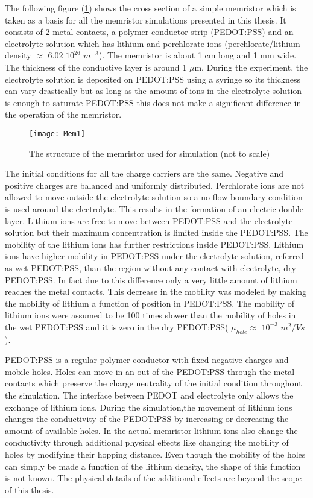 \begin{doublespace}
The following figure (\ref{MemStc}) shows the cross section of a simple memristor which is taken as a basis for all the memristor simulations presented in this thesis. It consists of 2 metal contacts, a polymer conductor strip (PEDOT:PSS) and an electrolyte solution which has lithium and perchlorate ions (perchlorate/lithium density $\approx$ 6.02 $10^{26}$ $m^{-3}$). The memristor is about 1 cm long and 1 mm wide. The thickness of the conductive layer is around 1 $\mu$m. During the experiment, the electrolyte solution is deposited on PEDOT:PSS using a syringe so its thickness can vary drastically but as long as the amount of ions in the electrolyte solution is enough to saturate PEDOT:PSS this does not make a significant difference in the operation of the memristor.

\begin{figure}[!htp]
\centering
\texttt{[image: Mem1]}
\caption{The structure of the memristor used for simulation (not to scale)} 
\label{MemStc}
\end{figure}

The initial conditions for all the charge carriers are the same. Negative and positive charges are balanced and uniformly distributed. Perchlorate ions are not allowed to move outside the electrolyte solution so a no flow boundary condition is used around the electrolyte. This results in the formation of an electric double layer. Lithium ions are free to move between PEDOT:PSS and the electrolyte solution but their maximum concentration is limited inside the PEDOT:PSS. The mobility of the lithium ions has further restrictions inside PEDOT:PSS. Lithium ions have higher mobility in PEDOT:PSS under the electrolyte solution, referred as wet PEDOT:PSS, than the region without any contact with electrolyte, dry PEDOT:PSS. In fact due to this difference only a very little amount of lithium reaches the metal contacts. This decrease in the mobility was modeled by making the mobility of lithium a function of position in PEDOT:PSS. The mobility of lithium ions were assumed to be 100 times slower than the mobility of holes in the wet PEDOT:PSS and it is zero in the dry PEDOT:PSS( $\mu_{hole} \approx$ $10^{-3}$ $m^2/Vs$). 

PEDOT:PSS is a regular polymer conductor with fixed negative charges and mobile holes. Holes can move in an out of the PEDOT:PSS through the metal contacts which preserve the charge neutrality of the initial condition throughout the simulation. The interface between PEDOT and electrolyte only allows the exchange of lithium ions. During the simulation,the movement of lithium ions changes the conductivity of the PEDOT:PSS by increasing or decreasing the amount of available holes. In the actual memristor lithium ions also change the conductivity through additional physical effects like changing the mobility of holes by modifying their hopping distance. Even though the mobility of the holes can simply be made a function of the lithium density, the shape of this function is not known. The physical details of the additional effects are beyond the scope of this thesis. 


\end{doublespace}
